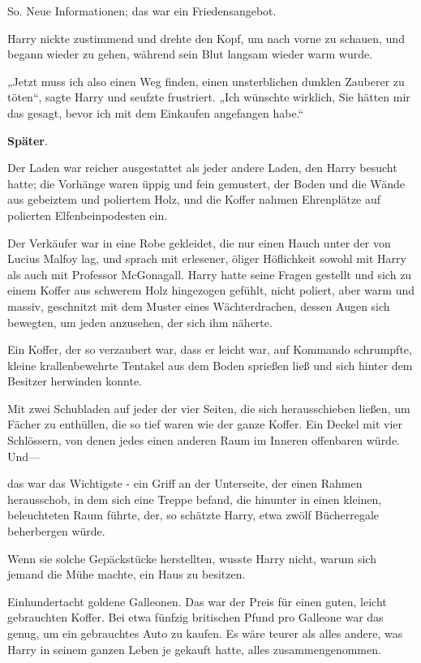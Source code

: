{So. Neue Informationen; das war ein Friedensangebot.

Harry nickte zustimmend und drehte den Kopf, um nach vorne zu schauen, und begann wieder zu gehen, während sein Blut langsam wieder warm wurde.

„Jetzt muss ich also einen Weg finden, einen unsterblichen dunklen Zauberer zu töten“, sagte Harry und seufzte frustriert. „Ich wünschte wirklich, Sie hätten mir das gesagt, bevor ich mit dem Einkaufen angefangen habe.“

\textbf{Später}.

Der Laden war reicher ausgestattet als jeder andere Laden, den Harry besucht hatte; die Vorhänge waren üppig und fein gemustert, der Boden und die Wände aus gebeiztem und poliertem Holz, und die Koffer nahmen Ehrenplätze auf polierten Elfenbeinpodesten ein.

Der Verkäufer war in eine Robe gekleidet, die nur einen Hauch unter der von Lucius Malfoy lag, und sprach mit erlesener, öliger Höflichkeit sowohl mit Harry als auch mit Professor McGonagall. Harry hatte seine Fragen gestellt und sich zu einem Koffer aus schwerem Holz hingezogen gefühlt, nicht poliert, aber warm und massiv, geschnitzt mit dem Muster eines Wächterdrachen, dessen Augen sich bewegten, um jeden anzusehen, der sich ihm näherte.

Ein Koffer, der so verzaubert war, dass er leicht war, auf Kommando schrumpfte, kleine krallenbewehrte Tentakel aus dem Boden sprießen ließ und sich hinter dem Besitzer herwinden konnte.

Mit zwei Schubladen auf jeder der vier Seiten, die sich herausschieben ließen, um Fächer zu enthüllen, die so tief waren wie der ganze Koffer. Ein Deckel mit vier Schlössern, von denen jedes einen anderen Raum im Inneren offenbaren würde. Und—

das war das Wichtigste - ein Griff an der Unterseite, der einen Rahmen herausschob, in dem sich eine Treppe befand, die hinunter in einen kleinen, beleuchteten Raum führte, der, so schätzte Harry, etwa zwölf Bücherregale beherbergen würde.

Wenn sie solche Gepäckstücke herstellten, wusste Harry nicht, warum sich jemand die Mühe machte, ein Haus zu besitzen.

Einhundertacht goldene Galleonen. Das war der Preis für einen guten, leicht gebrauchten Koffer. Bei etwa fünfzig britischen Pfund pro Galleone war das genug, um ein gebrauchtes Auto zu kaufen. Es wäre teurer als alles andere, was Harry in seinem ganzen Leben je gekauft hatte, alles zusammengenommen.

}
